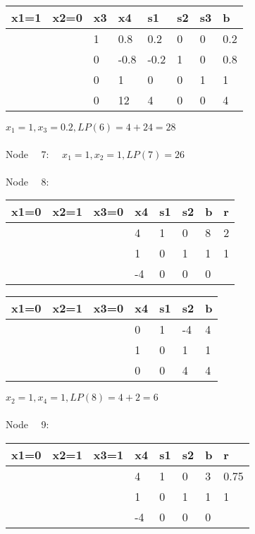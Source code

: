\documentclass{article} %
\numberwithin{equation}{section} %
\numberwithin{figure}{section} %
\numberwithin{table}{section} %
\begin{document}
\begin{center}
\begin{tabular}{|l|l|l|l|l|l|l|l|}
\hline
x1=1 & x2=0 & x3 & x4   & s1   & s2 & s3 & b   \\ \hline
     &      & 1  & 0.8  & 0.2  & 0  & 0  & 0.2 \\ \hline
     &      & 0  & -0.8 & -0.2 & 1  & 0  & 0.8 \\ \hline
     &      & 0  & 1    & 0    & 0  & 1  & 1   \\ \hline
     &      & 0  & 12   & 4    & 0  & 0  & 4   \\ \hline
\end{tabular}
\end{center}
$x_1=1,x_3=0.2,LP(6)=4+24=28$
\\
\\
Node \ \ 7: \  \ $x_1=1,x_2=1,LP(7)=26$
\\
\\
Node \ \ 8:
\begin{center}
\begin{tabular}{|l|l|l|l|l|l|l|l|}
\hline
x1=0 & x2=1 & x3=0 & x4 & s1 & s2 & b & r \\ \hline
     &      &      & 4  & 1  & 0  & 8 & 2 \\ \hline
     &      &      & 1  & 0  & 1  & 1 & 1 \\ \hline
     &      &      & -4 & 0  & 0  & 0 &   \\ \hline
\end{tabular}
\end{center}
\begin{center}
\begin{tabular}{|l|l|l|l|l|l|l|}
\hline
x1=0 & x2=1 & x3=0 & x4 & s1 & s2 & b \\ \hline
     &      &      & 0  & 1  & -4 & 4 \\ \hline
     &      &      & 1  & 0  & 1  & 1 \\ \hline
     &      &      & 0  & 0  & 4  & 4 \\ \hline
\end{tabular}
\end{center}
$x_2=1,x_4=1,LP(8)=4+2=6$
\\
\\
Node \ \ 9:
\begin{center}
\begin{tabular}{|l|l|l|l|l|l|l|l|}
\hline
x1=0 & x2=1 & x3=1 & x4 & s1 & s2 & b & r    \\ \hline
     &      &      & 4  & 1  & 0  & 3 & 0.75 \\ \hline
     &      &      & 1  & 0  & 1  & 1 & 1    \\ \hline
     &      &      & -4 & 0  & 0  & 0 &      \\ \hline
\end{tabular}
\end{center}
\end{document}
